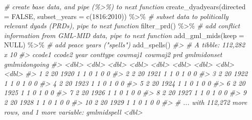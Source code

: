 \documentclass[
  11pt,
]{article}
\newenvironment{Shaded}{\begin{snugshade}}{\end{snugshade}}
\newcommand{\AttributeTok}[1]{\textcolor[rgb]{0.77,0.63,0.00}{#1}}
\newcommand{\CommentTok}[1]{\textcolor[rgb]{0.56,0.35,0.01}{\textit{#1}}}
\newcommand{\ConstantTok}[1]{\textcolor[rgb]{0.00,0.00,0.00}{#1}}
\newcommand{\DecValTok}[1]{\textcolor[rgb]{0.00,0.00,0.81}{#1}}
\newcommand{\FunctionTok}[1]{\textcolor[rgb]{0.00,0.00,0.00}{#1}}
\newcommand{\NormalTok}[1]{#1}
\newcommand{\SpecialCharTok}[1]{\textcolor[rgb]{0.00,0.00,0.00}{#1}}
\begin{document}
\begin{Shaded}
\begin{Highlighting}[]
\CommentTok{\# create base data, and pipe (\%\textgreater{}\%) to next function}
\FunctionTok{create\_dyadyears}\NormalTok{(}\AttributeTok{directed =} \ConstantTok{FALSE}\NormalTok{, }\AttributeTok{subset\_years =} \FunctionTok{c}\NormalTok{(}\DecValTok{1816}\SpecialCharTok{:}\DecValTok{2010}\NormalTok{)) }\SpecialCharTok{\%\textgreater{}\%}
  \CommentTok{\# subset data to politically relevant dyads (PRDs), pipe to next function}
  \FunctionTok{filter\_prd}\NormalTok{() }\SpecialCharTok{\%\textgreater{}\%}
  \CommentTok{\# add conflict information from GML{-}MID data, pipe to next function}
  \FunctionTok{add\_gml\_mids}\NormalTok{(}\AttributeTok{keep =} \ConstantTok{NULL}\NormalTok{) }\SpecialCharTok{\%\textgreater{}\%}
  \CommentTok{\# add peace years ("spells")}
  \FunctionTok{add\_spells}\NormalTok{()}
\CommentTok{\#\textgreater{} \# A tibble: 112,282 x 10}
\CommentTok{\#\textgreater{}    ccode1 ccode2  year conttype cowmaj1 cowmaj2   prd gmlmidonset gmlmidongoing}
\CommentTok{\#\textgreater{}     \textless{}dbl\textgreater{}  \textless{}dbl\textgreater{} \textless{}dbl\textgreater{}    \textless{}dbl\textgreater{}   \textless{}dbl\textgreater{}   \textless{}dbl\textgreater{} \textless{}dbl\textgreater{}       \textless{}dbl\textgreater{}         \textless{}dbl\textgreater{}}
\CommentTok{\#\textgreater{}  1      2     20  1920        1       1       0     1           0             0}
\CommentTok{\#\textgreater{}  2      2     20  1921        1       1       0     1           0             0}
\CommentTok{\#\textgreater{}  3      2     20  1922        1       1       0     1           0             0}
\CommentTok{\#\textgreater{}  4      2     20  1923        1       1       0     1           0             0}
\CommentTok{\#\textgreater{}  5      2     20  1924        1       1       0     1           0             0}
\CommentTok{\#\textgreater{}  6      2     20  1925        1       1       0     1           0             0}
\CommentTok{\#\textgreater{}  7      2     20  1926        1       1       0     1           0             0}
\CommentTok{\#\textgreater{}  8      2     20  1927        1       1       0     1           0             0}
\CommentTok{\#\textgreater{}  9      2     20  1928        1       1       0     1           0             0}
\CommentTok{\#\textgreater{} 10      2     20  1929        1       1       0     1           0             0}
\CommentTok{\#\textgreater{} \# ... with 112,272 more rows, and 1 more variable: gmlmidspell \textless{}dbl\textgreater{}}
\end{Highlighting}
\end{Shaded}
\end{document}
